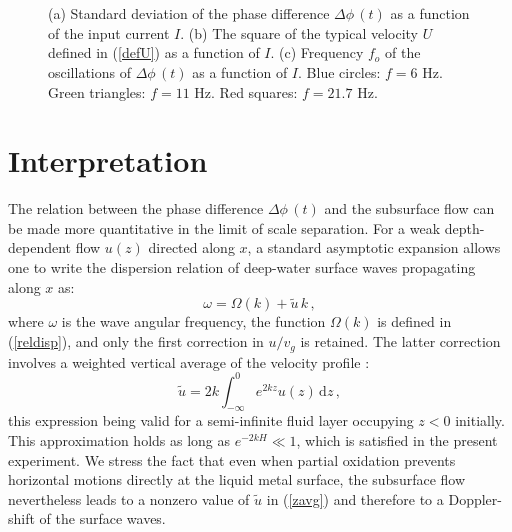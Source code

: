 \documentclass[doublecol]{epl2} %
\begin{document}
\begin{figure}[t]
   \\
\\
          \caption{(a) Standard deviation of the phase difference $\Delta\phi \, (t)$ as a function of the input current $I$. (b) The square of the typical velocity $U$ defined in (\ref{defU}) as a function of $I$. (c) Frequency $f_o$ of the oscillations of $\Delta\phi \, (t)$ as a function of $I$. Blue circles: $f=6$ Hz. Green triangles: $f=11$ Hz. Red squares: $f=21.7$ Hz.
    \label{fig:std_phi}}
\end{figure}


\section{Interpretation}

The relation between the phase difference $\Delta \phi \, (t)$ and the subsurface flow can be made more quantitative in the limit of scale separation. 
For a weak depth-dependent flow $u(z)$ directed along $x$, a standard asymptotic expansion allows one to write the dispersion relation of deep-water surface waves propagating along $x$ as:
\begin{equation}
\omega= \Omega(k) + \tilde{u} \, k \, , \label{Dshift}
\end{equation}
where $\omega$ is the wave angular frequency, the function $\Omega(k)$ is defined in (\ref{reldisp}), and only the first correction in $u/v_g$ is retained. The latter correction involves a weighted vertical average of the velocity profile \cite{Stewart1974}:
\begin{equation}
\tilde{u} = 2 k \int_{-\infty}^0 e^{2k z} u(z) \, \mathrm{d}z \, , \label{zavg}
\end{equation}
this expression being valid for a semi-infinite fluid layer occupying $z<0$ initially. This approximation holds as long as $e^{-2k H} \ll 1$, which is satisfied in the present experiment. We stress the fact that even when partial oxidation prevents horizontal motions directly at the liquid metal surface, the subsurface flow nevertheless leads to a nonzero value of $\tilde{u}$ in (\ref{zavg}) and therefore to a Doppler-shift of the surface waves.
\end{document}
